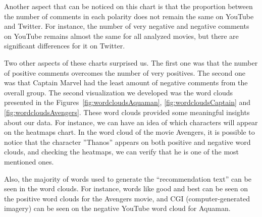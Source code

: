 Another aspect that can be noticed on this chart is that the proportion between the number of comments in each polarity does not remain the same on YouTube and Twitter. For instance, the number of very negative and negative comments on YouTube remains almost the same for all analyzed movies, but there are significant differences for it on Twitter.

Two other aspects of these charts surprised us. The first one was that the number of positive comments overcomes the number of very positives. The second one was that Captain Marvel had the least amount of negative comments from the overall group. 
The second visualization we developed was the word clouds presented in the Figures~\ref{fig:wordcloudsAquaman}, \ref{fig:wordcloudsCaptain} and \ref{fig:wordcloudsAvengers}. These word clouds provided some meaningful insights about our data. For instance, we can have an idea of which characters will appear on the heatmaps chart. In the word cloud of the movie Avengers, it is possible to notice that the character ''Thanos'' appears on both positive and negative word clouds, and checking the heatmaps, we can verify that he is one of the most mentioned ones.


Also, the majority of words used to generate the ``recommendation text'' can be seen in the word clouds. For instance, words like good and best can be seen on the positive word clouds for the Avengers movie, and CGI (computer-generated imagery) can be seen on the negative YouTube word cloud for Aquaman.

